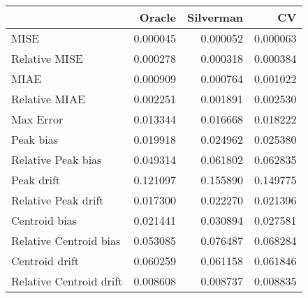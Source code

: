 \begin{tabular}{lrrr}
  \hline
 & Oracle & Silverman & CV \\ 
  \hline
MISE & 0.000045 & 0.000052 & 0.000063 \\ 
  Relative MISE & 0.000278 & 0.000318 & 0.000384 \\ 
  MIAE & 0.000909 & 0.000764 & 0.001022 \\ 
  Relative MIAE & 0.002251 & 0.001891 & 0.002530 \\ 
  Max Error & 0.013344 & 0.016668 & 0.018222 \\ 
  Peak bias & 0.019918 & 0.024962 & 0.025380 \\ 
  Relative Peak bias & 0.049314 & 0.061802 & 0.062835 \\ 
  Peak drift & 0.121097 & 0.155890 & 0.149775 \\ 
  Relative Peak drift & 0.017300 & 0.022270 & 0.021396 \\ 
  Centroid bias & 0.021441 & 0.030894 & 0.027581 \\ 
  Relative Centroid bias & 0.053085 & 0.076487 & 0.068284 \\ 
  Centroid drift & 0.060259 & 0.061158 & 0.061846 \\ 
  Relative Centroid drift & 0.008608 & 0.008737 & 0.008835 \\ 
   \hline
\end{tabular}
